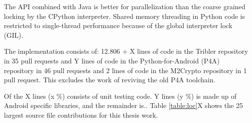 The API combined with Java is better for parallelization than the coarse grained locking by the CPython interpreter.
Shared memory threading in Python code is restricted to single-thread performance because of the global interpreter lock (GIL).






The implementation consists of:
12.806 + X lines of code in the Tribler repository in 35 pull requests and
Y lines of code in the Python-for-Android (P4A) repository in 46 pull requests and
2 lines of code in the M2Crypto repository in 1 pull request.
This excludes the work of reviving the old P4A toolchain.

Of the X lines (x \%) consists of unit testing code.
Y lines (y \%) is made up of Android specific libraries, and the remainder is..
Table \ref{table:loc}X shows the 25 largest source file contributions for this thesis work. 

